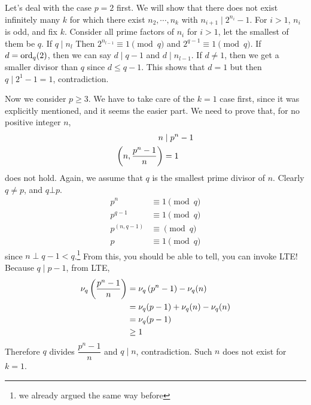 \begin{solution}
	Let's deal with the case $p=2$ first. We will show that there does not exist infinitely many $k$ for which there exist $n_2,\cdots,n_k$ with $n_{i+1}\mid 2^{n_i}-1$. For $i>1$, $n_i$ is odd, and fix $k$. Consider all prime factors of $n_i$ for $i>1$, let the smallest of them be $q$. If $q\mid n_{l}$ Then $2^{n_{l-1}}\equiv1\pmod q$ and $2^{q-1}\equiv1\pmod q$. If $d=\operatorname{ord}_q(2)$, then we can say $d\mid q-1$ and $d\mid n_{l-1}$. If $d\neq1$, then we get a smaller divisor than $q$ since $d\leq q-1$. This shows that $d=1$ but then $q\mid 2^1-1=1$, contradiction.

	Now we consider $p\geq3$. We have to take care of the $k=1$ case first, since it was explicitly mentioned, and it seems the easier part. We need to prove that, for no positive integer $n$,
		\begin{align*}
			n
				& \mid p^n-1\\
			\left(n,\dfrac{p^n-1}{n}\right) & = 1
		\end{align*}
	does not hold. Again, we assume that $q$ is the smallest prime divisor of $n$. Clearly $q\neq p$, and $q\bot p$.
		\begin{align*}
			p^n & \equiv1\pmod q\\
			p^{q-1}& \equiv1\pmod q\\
			p^{(n,q-1)} & \equiv\pmod q\\
			p & \equiv1\pmod q
		\end{align*}
	since $n\perp q-1<q$.\footnote{we already argued the same way before} From this, you should be able to tell, you can invoke LTE! Because $q\mid p-1$, from LTE,
		\begin{align*}
			\nu_{q}\left(\dfrac{p^n-1}{n}\right)  & = \nu_q\left(p^n-1\right)-\nu_q(n)\\
												& = \nu_q(p-1)+\nu_q(n)-\nu_q(n)\\
												& = \nu_q(p-1)\\
												&\geq1
		\end{align*}
	Therefore $q$ divides $\dfrac{p^n-1}{n}$ and $q\mid n$, contradiction. Such $n$ does not exist for $k=1$.


\end{solution}
